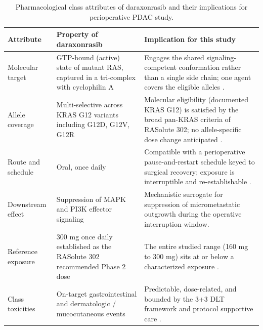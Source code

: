\begin{table}[t]
\centering
\caption{Pharmacological class attributes of daraxonrasib and their implications
for perioperative PDAC study.}
\label{tab:sec07-class}
\begin{tabularx}{\textwidth}{L{3.3cm} L{4.6cm} Y}
\toprule
\textbf{Attribute} & \textbf{Property of daraxonrasib} & \textbf{Implication for this study} \\
\midrule
Molecular target & GTP-bound (active) state of mutant RAS, captured in a tri-complex with cyclophilin A & Engages the shared signaling-competent conformation rather than a single side chain; one agent covers the eligible alleles \cite{daraxwhipple}. \\
Allele coverage & Multi-selective across KRAS G12 variants including G12D, G12V, G12R & Molecular eligibility (documented KRAS G12) is satisfied by the broad pan-KRAS criteria of RASolute 302; no allele-specific dose change anticipated \cite{onpremwhippl}. \\
Route and schedule & Oral, once daily & Compatible with a perioperative pause-and-restart schedule keyed to surgical recovery; exposure is interruptible and re-establishable \cite{onpremwhippl}. \\
Downstream effect & Suppression of MAPK and PI3K effector signaling & Mechanistic surrogate for suppression of micrometastatic outgrowth during the operative interruption window. \\
Reference exposure & 300 mg once daily established as the RASolute 302 recommended Phase 2 dose & The entire studied range (160 mg to 300 mg) sits at or below a characterized exposure \cite{daraxwhipple}. \\
Class toxicities & On-target gastrointestinal and dermatologic / mucocutaneous events & Predictable, dose-related, and bounded by the 3+3 DLT framework and protocol supportive care \cite{onpremwhippl}. \\
\bottomrule
\end{tabularx}
\end{table}
\vspace*{-1.4cm}

